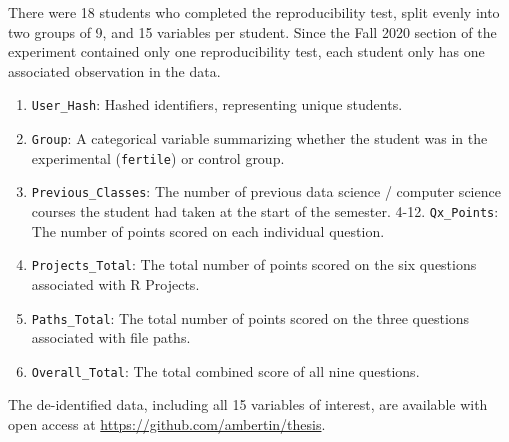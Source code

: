 \documentclass[12pt,twoside]{reedthesis}
\providecommand{\tightlist}{%
  \setlength{\itemsep}{0pt}\setlength{\parskip}{0pt}}
\begin{document}
There were 18 students who completed the reproducibility test, split evenly into two groups of 9, and 15 variables per student. Since the Fall 2020 section of the experiment contained only one reproducibility test, each student only has one associated observation in the data.
\begin{enumerate}
\def\labelenumi{\arabic{enumi}.}
\tightlist
\item
  \texttt{User\_Hash}: Hashed identifiers, representing unique students.
\item
  \texttt{Group}: A categorical variable summarizing whether the student was in the experimental (\texttt{fertile}) or control group.
\item
  \texttt{Previous\_Classes}: The number of previous data science / computer science courses the student had taken at the start of the semester.
  4-12. \texttt{Qx\_Points}: The number of points scored on each individual question.
\item
  \texttt{Projects\_Total}: The total number of points scored on the six questions associated with R Projects.
\item
  \texttt{Paths\_Total}: The total number of points scored on the three questions associated with file paths.
\item
  \texttt{Overall\_Total}: The total combined score of all nine questions.
\end{enumerate}
The de-identified data, including all 15 variables of interest, are available with open access at \url{https://github.com/ambertin/thesis}.
\end{document}
